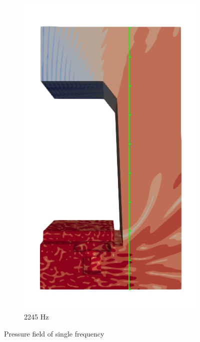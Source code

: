 \begin{figure}[H]
\begin{subfigure}[b]{0.3\textwidth}
		\includegraphics[width=\linewidth]{fig/chap5/freq_steps/field_result_2245Hz.png}
		\caption{2245 Hz}
	\end{subfigure}
	\caption{Pressure field of single frequency}
\end{figure}
